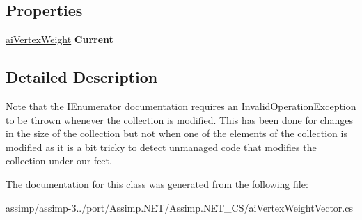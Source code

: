 \subsection*{Properties}
\begin{DoxyCompactItemize}
\item 
\hypertarget{classai_vertex_weight_vector_1_1ai_vertex_weight_vector_enumerator_aaca1e95de19a4ce971036f8b7f4da917}{\hyperlink{structai_vertex_weight}{ai\+Vertex\+Weight} {\bfseries Current}}\label{classai_vertex_weight_vector_1_1ai_vertex_weight_vector_enumerator_aaca1e95de19a4ce971036f8b7f4da917}

\end{DoxyCompactItemize}


\subsection{Detailed Description}
Note that the I\+Enumerator documentation requires an Invalid\+Operation\+Exception to be thrown whenever the collection is modified. This has been done for changes in the size of the collection but not when one of the elements of the collection is modified as it is a bit tricky to detect unmanaged code that modifies the collection under our feet. 

The documentation for this class was generated from the following file\+:\begin{DoxyCompactItemize}
\item 
assimp/assimp-\/3../port/\+Assimp.\+N\+E\+T/\+Assimp.\+N\+E\+T\+\_\+\+C\+S/ai\+Vertex\+Weight\+Vector.\+cs\end{DoxyCompactItemize}
